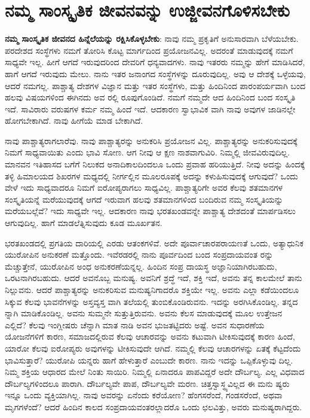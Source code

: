 
\chapter{ನಮ್ಮ ಸಾಂಸ್ಕೃತಿಕ ಜೀವನವನ್ನು ಉಜ್ಜೀವನಗೊಳಿಸಬೇಕು}

\textbf{ನಮ್ಮ ಸಾಂಸ್ಕೃತಿಕ ಜೀವನದ ಹಿನ್ನೆಲೆಯನ್ನು ರಕ್ಷಿಸಿಕೊಳ್ಳಬೇಕು}: ನಾವು ನಮ್ಮ ಪ್ರಕೃತಿಗೆ ಅನುಸಾರವಾಗಿ ಬೆಳೆಯಬೇಕು. ಪರದೇಶದ ಸಂಸ್ಥೆಗಳು ನಮಗೆ ತೋರಿಸಿ ಕೊಟ್ಟ ಮಾರ್ಗದಿಂದ ಪ್ರಯೋಜನವಿಲ್ಲ. ಅದರಂತೆ ಮಾಡುವುದಕ್ಕೆ ನಮಗೆ ಸಾಧ್ಯವೇ ಇಲ್ಲ. ಹೀಗೆ ಆಗದೆ ಇರುವುದರಿಂದ ದೇವರಿಗೆ ಧನ್ಯವಾದಗಳು. ನಾವು ಇತರರು ನಮ್ಮನ್ನು ಹೇಗೆ ಮಾಡಿಸಿದರೆ, ಹಾಗೆ ಆಗದೆ ಇರುವುದು ಮೇಲು. ನಾನು ಇತರ ಜನಾಂಗದ ಸಂಸ್ಥೆಗಳನ್ನು ದೂರುವುದಿಲ್ಲ. ಅವು ಆ ದೇಶಕ್ಕೆ ಒಳ್ಳೆಯವು, ಆದರೆ ನಮಗಲ್ಲ. ಪಾಶ್ಚಾತ್ಯ ದೇಶಗಳ ವಿಜ್ಞಾನ ಮತ್ತು ಇತರ ಸಂಸ್ಥೆಗಳು, ಮತ್ತು ಹಿಂದಿನಿಂದ ಪಾರಂಪರ್ಯವಾಗಿ ಬಂದ ಹಲವು ವಿಷಯಗಳಿಂದ ಈಗಿನದು ಅವ ರಲ್ಲಿ ರೂಪುಗೊಂಡಿದೆ. ನಮಗೆ ನಮ್ಮದೇ ಆದ ಹಿಂದಿನಿಂದ ಬಂದ ಸಂಸ್ಕೃತಿ ಇದೆ. ಸಾವಿರಾರು ವರುಷಗಳ ಕರ್ಮ ನಮ್ಮ ಹಿಂದೆ ಇದೆ. ಆದಕಾರಣ ಸ್ವಾಭಾವಿಕ ವಾಗಿ ನಾವು ಅವುಗಳ ಜಾಡಿನಲ್ಲೇ ಹೋಗಬೇಕಾಗಿದೆ. ನಾವು ಹೀಗೆಯೆ ಮಾಡ ಬೇಕಾಗಿದೆ.

ನಾವು ಪಾಶ್ಚಾತ್ಯರಾಗಲಾರೆವು. ನಾವು ಪಾಶ್ಚಾತ್ಯರನ್ನು ಅನುಕರಿಸಿ ಪ್ರಯೋಜನ ವಿಲ್ಲ. ಪಾಶ್ಚಾತ್ಯರನ್ನು ಅನುಕರಿಸುವುದಕ್ಕೆ ನಿಮಗೆ ಸಾಧ್ಯವಾಯಿತು ಎಂದು ಭಾವಿ ಸೋಣ. ಆಗ ನೀವು ಆ ಕ್ಷಣ ನಾಶವಾಗುವಿರಿ. ನಿಮ್ಮಲ್ಲಿ ಜೀವವಿರುವುದಿಲ್ಲ. ಮಾನವನ ಇತಿಹಾಸದ ಬಗೆಗೆ ನಿಲುಕದ ಅನಾದಿಕಾಲದಿಂದಲೂ ಒಂದು ಪ್ರವಾಹ ಹರಿಯುತ್ತಿದೆ. ನೀವು ಅದನ್ನು ಹಿಂದಕ್ಕೆ ತಳ್ಳಿ ಹಿಮಾಲಯದ ಶಿಖರಗಳ ಮಧ್ಯದಲ್ಲಿ ನೀರ್ಗಲ್ಲಿನ ಮೂಲರೂಪಕ್ಕೆ ಅದನ್ನು ಕಳುಹಿಸುವುದಕ್ಕೆ ಆಗುವುದೆ? ಒಂದು ವೇಳೆ ಇದು ಸಾಧ್ಯವಾದರೂ ನಿಮಗೆ ಐರೋಪ್ಯರಾಗಲು ಸಾಧ್ಯವಿಲ್ಲ. ಪಾಶ್ಚಾತ್ಯರಿಗೇ ಅವರ ಕೆಲವು ಶತಮಾನಗಳ ಸಂಸ್ಕೃತಿಯನ್ನೆ ಮರೆಯುವುದಕ್ಕೆ ಆಗದೆ ಇರುವಾಗ ಹಲವು ಶತಮಾನಗಳಿಂದ ಬಂದಿರುವ ನಮ್ಮ ಸಂಸ್ಕೃತಿಯನ್ನು ಮರೆಯಬಲ್ಲೆವೆ? ಇದು ಸಾಧ್ಯವೇ ಇಲ್ಲ. ಆದಕಾರಣ ನಾವು ಭರತಖಂಡವನ್ನೇ ಪಾಶ್ಚಾತ್ಯ ದೇಶದಂತೆ ಮಾರ್ಪಡಿಸಲು ಆಗುವುದಿಲ್ಲ. ಹಾಗೆ ಮಾಡಲೆತ್ನಿಸುವುದು ಕೂಡ ಮೂರ್ಖತನ.

ಭರತಖಂಡದಲ್ಲಿ ಪ್ರಗತಿಯ ದಾರಿಯಲ್ಲಿ ಎರಡು ಆತಂಕಗಳಿವೆ. ಅದೇ ಪೂರ್ವಾಚಾರಪರಾಯಣತೆ ಒಂದು, ಅತ್ಯಾಧುನಿಕ ಯುರೋಪಿನ ಅನುಕರಣೆ ಮತ್ತೊಂದು. ಇವೆರಡರಲ್ಲಿ ನಾನು ಪೂರ್ವದಿಂದ ಬಂದ ಸಂಪ್ರದಾಯವಂತ ರನ್ನು ಮೆಚ್ಚುತ್ತೇನೆ, ಯುರೋಪಿನ ಅಂಧ ಅನುಕರಣೆಯನ್ನಲ್ಲ. ಹಿಂದಿನ ಸಂಪ್ರ ದಾಯಸ್ಥ ಅಜ್ಞಾನಿಯಾಗಿರಬಹುದು, ಒರಟನಾಗಿರಬಹುದು. ಆದರೆ ಅವನೊಬ್ಬ ಮನುಷ್ಯ. ಅವನಿಗೆ ಶ್ರದ್ಧೆ ಇದೆ, ಶಕ್ತಿ ಇದೆ, ಅವನು ತನ್ನ ಕಾಲಮೇಲೆ ತಾನು ನಿಲ್ಲುವನು. ಆದರೆ ಪಾಶ್ಚಾತ್ಯರನ್ನು ಅನುಕರಿಸುವ ಮನುಷ್ಯನಿಗಾದರೊ ಶಕ್ತಿಯೇ ಇಲ್ಲ. ಅವನು ಎಲ್ಲಾ ಕಡೆಯಿಂದಲೂ ಸಿಕ್ಕುವ ಕೆಲವು ಭಾವನೆಗಳನ್ನು ಅಸ್ತವ್ಯಸ್ತ ವಾಗಿ ತಲೆಯಲ್ಲಿ ತುಂಬಿಕೊಂಡಿರುವನು. ಇದನ್ನು ಅರಗಿಸಿಕೊಂಡಿಲ್ಲ. ತನ್ನದ ನ್ನಾಗಿ ಮಾಡಿಕೊಂಡಿಲ್ಲ. ಅವನು ಸುಮ್ಮನೇ ಸುತ್ತುತ್ತಿರುವನು. ಅವನು ಕೆಲಸ ಮಾಡುವುದಕ್ಕೆ ಮೂಲ ಉತ್ತೇಜನ ಎಲ್ಲಿದೆ? ಕೆಲವು ಇಂಗ್ಲೀಷರು ಚೆನ್ನಾಗಿ ಮಾತ ನಾಡಿ ಅವನ ಭುಜತಟ್ಟಿದರು ಅಷ್ಟೆ. ಅವನ ಸುಧಾರಣೆಯ ಯೋಜನೆಗಳಿಗೆ ಕಾರಣ, ಸಮಾಜದಲ್ಲಿರುವ ಕೆಲವು ಆಚಾರವನ್ನು ಅವನು ಕಟುವಾಗಿ ಟೀಕಿಸುವುದಕ್ಕೆ ಕಾರಣ ಹಿಂದೆ, ಯಾರೋ ಕೆಲವು ಐರೋಪ್ಯರು ಅವುಗಳನ್ನು ಟೀಕಿಸುವುದೇ ಆಗಿದೆ. ನಮ್ಮಲ್ಲಿ ಕೆಲವು ಆಚಾರಗಳನ್ನು ಏತಕ್ಕೆ ಕೆಟ್ಟದೆಂದು ಭಾವಿಸುತ್ತಾರೆ? ಯುರೋಪಿ ಯನ್ನರು ಹಾಗೆ ಹೇಳುತ್ತಾರೆ ಎಂಬುದೇ ಕಾರಣ. ನಾನು ಇದನ್ನು ಒಪ್ಪಿಕೊಳ್ಳುವು ದಿಲ್ಲ. ನಿಮ್ಮ ಶಕ್ತಿಯ ಆಧಾರದ ಮೇಲೆ ನಿಂತು ಸಾಯಿರಿ. ನಿಮ್ಮಲ್ಲಿ ಏನಾದರೂ ಪಾಪವಿದ್ದರೆ ಅದೇ ದೌರ್ಬಲ್ಯ. ಎಲ್ಲ ವಿಧವಾದ ದೌರ್ಬಲ್ಯಗಳಿಂದಲೂ ಪಾರಾಗಿ. ದೌರ್ಬಲ್ಯವೇ ಪಾಪ, ದೌರ್ಬಲ್ಯವೇ ಮರಣ. ಚಿತ್ತಸ್ವಾಸ್ಥ್ಯವಿಲ್ಲದ ಈ ಮನು ಷ್ಯರು ಇನ್ನೂ ಒಂದು ವ್ಯಕ್ತಿಯಾಗಿಲ್ಲ. ನಾವು ಅವರನ್ನು ಏನೆಂದು ಕರೆಯೋಣ? ಹೆಂಗಸರೆಂದೆ, ಗಂಡಸರೆಂದೆ, ಅಥವಾ ಮೃಗಗಳೆಂದೆ? ಆದರೆ ಹಿಂದಿನ ಕಾಲದ ಸಂಪ್ರದಾಯವಂತರಲ್ಲಾದರೊ ಒಂದು ಛಲವಿತ್ತು, ಅವರು ಮನುಷ್ಯರಾಗಿದ್ದರು.

